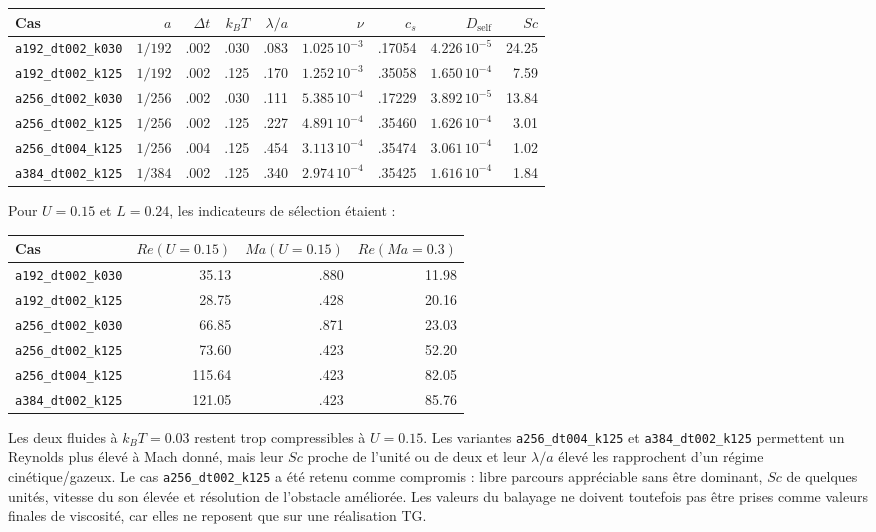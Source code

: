 \documentclass[11pt,a4paper]{article}
\begin{document}
\begin{center}
\scriptsize
\begin{tabular}{lrrrrrrrr}
\toprule
Cas & $a$ & $\Delta t$ & $k_BT$ & $\lambda/a$ & $\nu$ & $c_s$ & $D_{\mathrm{self}}$ & $Sc$ \\
\midrule
\texttt{a192\_dt002\_k030} & $1/192$ & .002 & .030 & .083 & $1.025\,10^{-3}$ & .17054 & $4.226\,10^{-5}$ & 24.25 \\
\texttt{a192\_dt002\_k125} & $1/192$ & .002 & .125 & .170 & $1.252\,10^{-3}$ & .35058 & $1.650\,10^{-4}$ & 7.59 \\
\texttt{a256\_dt002\_k030} & $1/256$ & .002 & .030 & .111 & $5.385\,10^{-4}$ & .17229 & $3.892\,10^{-5}$ & 13.84 \\
\texttt{a256\_dt002\_k125} & $1/256$ & .002 & .125 & .227 & $4.891\,10^{-4}$ & .35460 & $1.626\,10^{-4}$ & 3.01 \\
\texttt{a256\_dt004\_k125} & $1/256$ & .004 & .125 & .454 & $3.113\,10^{-4}$ & .35474 & $3.061\,10^{-4}$ & 1.02 \\
\texttt{a384\_dt002\_k125} & $1/384$ & .002 & .125 & .340 & $2.974\,10^{-4}$ & .35425 & $1.616\,10^{-4}$ & 1.84 \\
\bottomrule
\end{tabular}
\end{center}

Pour $U=0.15$ et $L=0.24$, les indicateurs de sélection étaient :

\begin{center}
\small
\begin{tabular}{lrrr}
\toprule
Cas & $Re(U=0.15)$ & $Ma(U=0.15)$ & $Re(Ma=0.3)$ \\
\midrule
\texttt{a192\_dt002\_k030} & 35.13 & .880 & 11.98 \\
\texttt{a192\_dt002\_k125} & 28.75 & .428 & 20.16 \\
\texttt{a256\_dt002\_k030} & 66.85 & .871 & 23.03 \\
\texttt{a256\_dt002\_k125} & 73.60 & .423 & 52.20 \\
\texttt{a256\_dt004\_k125} & 115.64 & .423 & 82.05 \\
\texttt{a384\_dt002\_k125} & 121.05 & .423 & 85.76 \\
\bottomrule
\end{tabular}
\end{center}

Les deux fluides à $k_BT=0.03$ restent trop compressibles à $U=0.15$. Les variantes \texttt{a256\_dt004\_k125} et \texttt{a384\_dt002\_k125} permettent un Reynolds plus élevé à Mach donné, mais leur $Sc$ proche de l'unité ou de deux et leur $\lambda/a$ élevé les rapprochent d'un régime cinétique/gazeux. Le cas \texttt{a256\_dt002\_k125} a été retenu comme compromis : libre parcours appréciable sans être dominant, $Sc$ de quelques unités, vitesse du son élevée et résolution de l'obstacle améliorée. Les valeurs du balayage ne doivent toutefois pas être prises comme valeurs finales de viscosité, car elles ne reposent que sur une réalisation TG.
\end{document}
